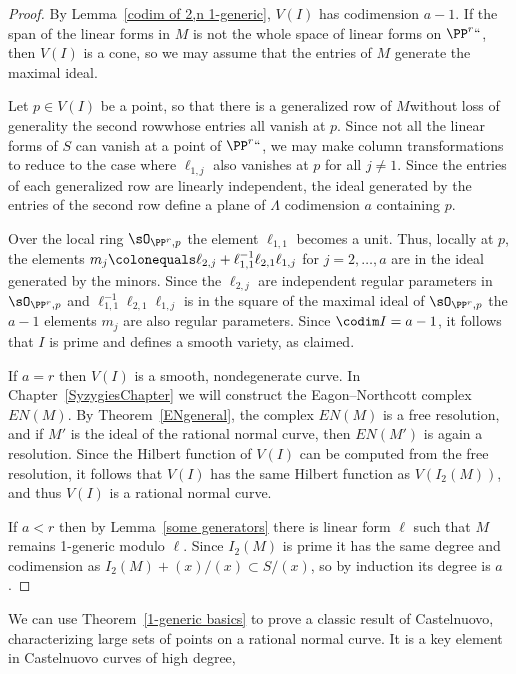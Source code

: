 \begin{proof}  By Lemma~\ref{codim of 2,n 1-generic},  $V(I)$ has
codimension $a-1$.
If the span of the linear forms in $M$ is not the whole space of linear
forms on $\PP^r` `$, then $V(I)$ is a cone,
so we may assume that the entries of $M$ generate the maximal ideal.

Let $p\in V(I)$ be a point, so that there is a generalized row of
$M$\emdash without loss of generality the second row\emdash whose
entries all vanish
at $p$. Since not all the linear forms
of $S$ can vanish at a point of $\PP^r` `$, we may make column
transformations to reduce to the case where
$\ell_{1,j}$ also vanishes at $p$ for all $j\neq 1$. Since the entries
of each generalized row are linearly independent, the ideal generated
by the entries of the second row define a plane of
$\Lambda$ codimension $a$ containing $p$.

Over the local ring $\sO_{\PP^r, p}$ the element $\ell_{1,1}$ becomes
a unit.
Thus, locally at $p$, the elements $m_{j}\colonequals  \ell_{2,j}+
\ell_{1,1}^{-1}\ell_{2,1}\ell_{1,j}$ for $j=2,\dots, a$ are in the
ideal generated
by the minors. Since the $\ell_{2,j}$ are independent regular parameters
in $\sO_{\PP^r, p}$ and
$\ell_{1,1}^{-1}\ell_{2,1}\ell_{1,j}$ is in the square of the maximal
ideal of $\sO_{\PP^r, p}$ the
$a-1$ elements $m_{j}$
are also regular parameters. Since $\codim I = a-1$, it follows that $I$
is prime and defines a smooth variety, as claimed.

If $a=r$ then $V(I)$ is a smooth, nondegenerate curve. In
Chapter~\ref{SyzygiesChapter} we will construct the Eagon--Northcott
complex $EN(M)$. By Theorem~\ref{ENgeneral}, the complex $EN(M)$ is a
free resolution,
and if $M'$ is the ideal of the rational normal curve, then $EN(M')$
is again a resolution. Since the Hilbert
function of $V(I)$ can be computed from the free resolution, it follows
that $V(I)$ has the same Hilbert function
as $V(I_2(M))$, and thus $V(I)$ is a rational normal curve.

If $a<r$ then by Lemma~\ref{some generators} there is linear form $\ell$
such that $M$ remains 1-generic modulo $\ell$.
Since $I_2(M)$ is prime it has the same degree and codimension as $I_2(M)
+(x)/(x) \subset S/(x)$, so by induction its degree
is $a$.
\end{proof}

We can use Theorem~\ref{1-generic basics} to prove a classic result of
Castelnuovo, characterizing large sets of
%
points on a rational normal curve. It is a key element in
Castelnuovo curves of high
degree, 

